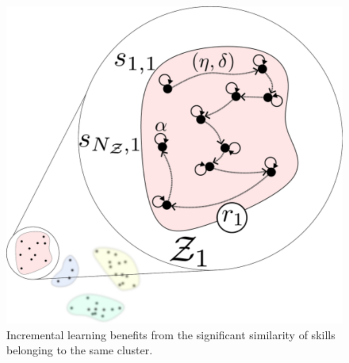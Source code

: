\begin{figure}[!t]
	\centering
	\includegraphics[width=0.95\columnwidth]{fig/intra_skill_learning.pdf}
	\caption{Incremental learning benefits from the significant similarity of skills belonging to the same cluster.}
	\label{fig:intra_skill_learning}
\end{figure}
